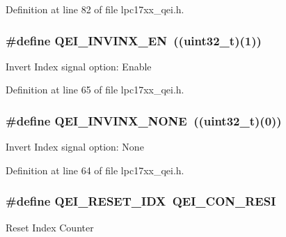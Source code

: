 \-Definition at line 82 of file lpc17xx\-\_\-qei.\-h.

\hypertarget{group___q_e_i___public___macros_ga0f2f9afd7f46adf874e7627968f9759e}{
\subsubsection[{\-Q\-E\-I\-\_\-\-I\-N\-V\-I\-N\-X\-\_\-\-E\-N}]{\setlength{\rightskip}{0pt plus 5cm}\#define {\bf \-Q\-E\-I\-\_\-\-I\-N\-V\-I\-N\-X\-\_\-\-E\-N}~((uint32\-\_\-t)(1))}}\label{group___q_e_i___public___macros_ga0f2f9afd7f46adf874e7627968f9759e}
\-Invert \-Index signal option\-: \-Enable 

\-Definition at line 65 of file lpc17xx\-\_\-qei.\-h.

\hypertarget{group___q_e_i___public___macros_gaf5a7b0a1a513675800273f51b3fd2e4b}{
\subsubsection[{\-Q\-E\-I\-\_\-\-I\-N\-V\-I\-N\-X\-\_\-\-N\-O\-N\-E}]{\setlength{\rightskip}{0pt plus 5cm}\#define {\bf \-Q\-E\-I\-\_\-\-I\-N\-V\-I\-N\-X\-\_\-\-N\-O\-N\-E}~((uint32\-\_\-t)(0))}}\label{group___q_e_i___public___macros_gaf5a7b0a1a513675800273f51b3fd2e4b}
\-Invert \-Index signal option\-: \-None 

\-Definition at line 64 of file lpc17xx\-\_\-qei.\-h.

\hypertarget{group___q_e_i___public___macros_ga89c2027b368cffe89ac1d2b5b4cce9bb}{
\subsubsection[{\-Q\-E\-I\-\_\-\-R\-E\-S\-E\-T\-\_\-\-I\-D\-X}]{\setlength{\rightskip}{0pt plus 5cm}\#define {\bf \-Q\-E\-I\-\_\-\-R\-E\-S\-E\-T\-\_\-\-I\-D\-X}~{\bf \-Q\-E\-I\-\_\-\-C\-O\-N\-\_\-\-R\-E\-S\-I}}}\label{group___q_e_i___public___macros_ga89c2027b368cffe89ac1d2b5b4cce9bb}
\-Reset \-Index \-Counter 

